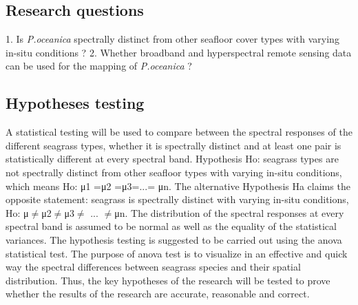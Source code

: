 \documentclass[10pt, a4paper]{article}
\begin{document}
\subsection{Research questions}
1. Is \textit{P.oceanica} spectrally distinct from other seafloor cover types with varying in-situ
conditions ?
2. Whether broadband and hyperspectral remote sensing data can be used for the mapping of
\textit{P.oceanica} ?

\subsection{Hypotheses testing}
A statistical testing will be used to compare between the spectral responses of the different seagrass
types, whether it is spectrally distinct and at least one pair is statistically different at every spectral
band.
Hypothesis Ho: seagrass types are not spectrally distinct from other seafloor types with
varying in-situ conditions, which means
Ho: μ1 =μ2 =μ3=...= μn.
The alternative Hypothesis Ha claims the opposite statement: seagrass is spectrally
distinct with varying in-situ conditions, Ho: μ$\neq$μ2$\neq$μ3$\neq$ ... $\neq$μn.
The distribution of the spectral responses at every spectral band is assumed to be normal as well as
the equality of the statistical variances.
The hypothesis testing is suggested to be carried out using the anova statistical test. The purpose of
anova test is to visualize in an effective and quick way the spectral differences between seagrass
species and their spatial distribution. Thus, the key hypotheses of the research will be tested to prove
whether the results of the research are accurate, reasonable and correct.
\end{document}
